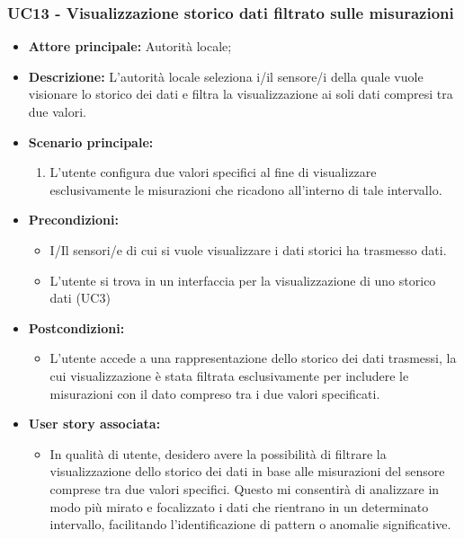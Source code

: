 \documentclass{article}
\begin{document}
\subsubsection{UC13 - Visualizzazione storico dati filtrato sulle misurazioni}
\begin{itemize}
    \item \textbf{Attore principale:} Autorità locale;
    \item \textbf{Descrizione:} L’autorità locale seleziona i/il sensore/i della quale vuole visionare lo storico dei dati e filtra la visualizzazione ai soli dati compresi tra due valori.
    \item \textbf{Scenario principale:}
          \begin{enumerate}
              \item L'utente configura due valori specifici al fine di visualizzare esclusivamente le misurazioni che ricadono all'interno di tale intervallo.
          \end{enumerate}
    \item \textbf{Precondizioni:}
          \begin{itemize}
              \item  I/Il sensori/e di cui si vuole visualizzare i dati storici ha trasmesso dati.
              \item  L'utente si trova in un interfaccia per la visualizzazione di uno storico dati (UC3)
          \end{itemize}
    \item \textbf{Postcondizioni:}
          \begin{itemize}
              \item  L'utente accede a una rappresentazione dello storico dei dati trasmessi, la cui visualizzazione è stata filtrata esclusivamente per includere le misurazioni con il dato compreso tra i due valori specificati.
          \end{itemize}
    \item \textbf{User story associata:}
          \begin{itemize}
            \item In qualità di utente, desidero avere la possibilità di filtrare la visualizzazione dello storico dei dati in base alle misurazioni del sensore comprese tra due valori specifici. Questo mi consentirà di analizzare in modo più mirato e focalizzato i dati che rientrano in un determinato intervallo, facilitando l'identificazione di pattern o anomalie significative.
          \end{itemize}
\end{itemize}
\end{document}

